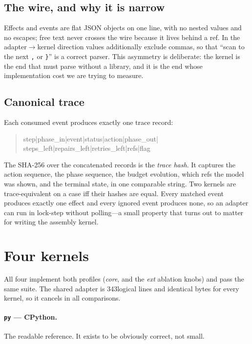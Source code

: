 \documentclass[11pt,a4paper]{article}
\begin{document}
\subsection{The wire, and why it is narrow}

Effects and events are flat JSON objects on one line, with no nested values and
no escapes; free text never crosses the wire because it lives behind a ref. In
the adapter$\rightarrow$kernel direction values additionally exclude commas, so
that ``scan to the next \texttt{,} or \texttt{\}}'' is a correct parser. This
asymmetry is deliberate: the kernel is the end that must parse without a
library, and it is the end whose implementation cost we are trying to measure.

\subsection{Canonical trace}

Each consumed event produces exactly one trace record:

\begin{quote}\footnotesize\ttfamily
step|phase\_in|event|status|action|phase\_out|\\
steps\_left|repairs\_left|retries\_left|refs|flag
\end{quote}

The SHA-256 over the concatenated records is the \emph{trace hash}. It captures
the action sequence, the phase sequence, the budget evolution, which refs the
model was shown, and the terminal state, in one comparable string. Two kernels
are trace-equivalent on a case iff their hashes are equal. Every matched event
produces exactly one effect and every ignored event produces none, so an
adapter can run in lock-step without polling---a small property that turns out
to matter for writing the assembly kernel.

\section{Four kernels}
\label{sec:kernels}

All four implement both profiles (\emph{core}, and the \emph{ext} ablation
knobs) and pass the same suite. The shared adapter is 343logical
lines and identical bytes for every kernel, so it cancels in all comparisons.

\paragraph{\texttt{py} --- CPython.} The readable reference. It exists to be
obviously correct, not small.
\end{document}
